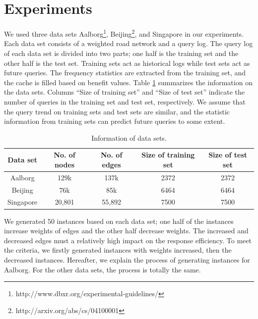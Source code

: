 \section{Experiments }
\label{sec:exp}

We used three data sets Aalborg\footnote{http://www.dbxr.org/experimental-guidelines/}, Beijing\footnote{http://arxiv.org/abs/cs/04100001}, and Singapore \citep{Song2014PRESS} in our experiments. Each data set consists of a weighted road network and a query log.
The query log of each data set is divided into two parts; one half is the training set and the other half is the test set. Training sets act as historical logs while test sets act as future queries. The frequency statistics are extracted from the training set, and the cache is filled based on benefit values.
Table \ref{tab:datasetinfo} summarizes the information on the data sets. Columns ``Size of training set'' and ``Size of test set'' indicate the number of queries in the training set and test set, respectively. We assume that the query trend on training sets and test sets are similar, and the statistic information from training sets can predict future queries to some extent.

 \begin{table}[htbp]
 \caption{Information of data sets.}
 \centering
 \label{tab:datasetinfo}
{
 \begin{tabular}{c|c|c|c|c}
 \hline
  Data set   & No. of nodes & No. of edges & Size of training set & Size of test set\\
  \hline
  Aalborg    & 129k         & 137k         &2372                            & 2372\\
  \hline
   Beijing   & 76k          &85k           &6464                            & 6464\\
  \hline
   Singapore & 20,801       &55,892        &7500                            & 7500\\
   \hline
 \end{tabular}
}
\end{table}

We generated 50 instances based on each data set; one half of the instances increase weights of edges and the other half decrease weights. The increased and decreased edges must a relatively high impact on the response efficiency.
To meet the criteria, we firstly generated instances with weights increased, then the decreased instances. Hereafter, we explain the process of generating instances for Aalborg. For the other data sets, the process is totally the same.

